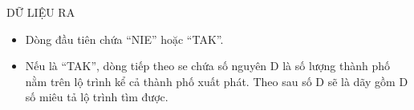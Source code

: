 DỮ LIỆU RA
\begin{itemize}
	\item Dòng đầu tiên chứa “NIE” hoặc “TAK”.
	\item Nếu là “TAK”, dòng tiếp theo se chứa số nguyên D là số lượng thành phố nằm trên lộ trình kể cả thành phố xuất phát. Theo sau số D sẽ là dãy gồm D số miêu tả lộ trình tìm được.
\end{itemize}